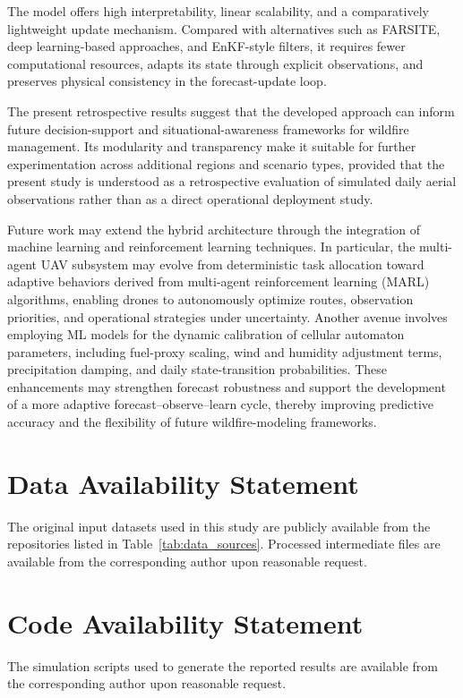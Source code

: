 \documentclass[10pt,letterpaper]{article}
\begin{document}
The model offers high interpretability, linear scalability, and a
comparatively lightweight update mechanism. Compared with alternatives
such as FARSITE, deep learning-based approaches, and EnKF-style filters,
it requires fewer computational resources, adapts its state through
explicit observations, and preserves physical consistency in the
forecast-update loop.

The present retrospective results suggest that the developed approach
can inform future decision-support and situational-awareness frameworks
for wildfire management. Its modularity and
transparency make it suitable for further experimentation across
additional regions and scenario types, provided that the present study
is understood as a retrospective evaluation of simulated daily aerial
observations rather than as a direct operational deployment study.

Future work may extend the hybrid architecture through the
integration of machine learning and reinforcement learning techniques.
In particular, the multi-agent UAV subsystem may evolve from
deterministic task allocation toward adaptive behaviors derived from
multi-agent reinforcement learning (MARL) algorithms, enabling drones to
autonomously optimize routes, observation priorities, and operational
strategies under uncertainty. Another avenue involves employing ML
models for the dynamic calibration of cellular automaton parameters,
including fuel-proxy scaling, wind and humidity adjustment terms,
precipitation damping, and daily state-transition probabilities. These
enhancements may strengthen
forecast robustness and support the development of a more adaptive
forecast--observe--learn cycle, thereby improving predictive accuracy
and the flexibility of future wildfire-modeling frameworks.

\section*{Data Availability Statement}
The original input datasets used in this study are publicly available from the repositories listed in Table~\ref{tab:data_sources}. Processed intermediate files are available from the corresponding author upon reasonable request.

\section*{Code Availability Statement}
The simulation scripts used to generate the reported results are available from the corresponding author upon reasonable request.
\end{document}
